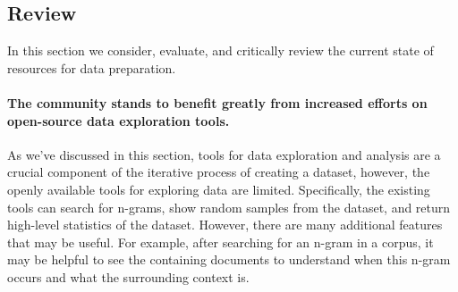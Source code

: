 








\subsection{Review}

In this section we consider, evaluate, and critically review the current state of resources for data preparation.

\paragraph{The community stands to benefit greatly from increased efforts on open-source data exploration tools.}
As we've discussed in this section, tools for data exploration and analysis are a crucial component of the iterative process of creating a dataset, however, the openly available tools for exploring data are limited.
Specifically, the existing tools can search for n-grams, show random samples from the dataset, and return high-level statistics of the dataset.
However, there are many additional features that may be useful. For example, after searching for an n-gram in a corpus, it may be helpful to see the containing documents to understand when this n-gram occurs and what the surrounding context is.

